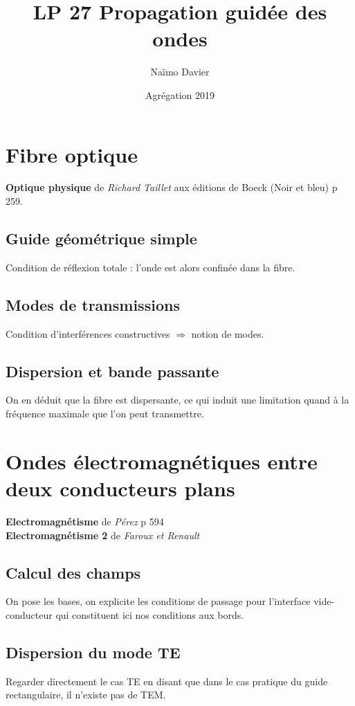\documentclass[12pt,prb,aps,epsf]{article}
\begin{document}
	
	\title{LP 27 Propagation guidée des ondes}
	\author{Naïmo Davier}
	\date{Agrégation 2019}
	\maketitle
	
	\tableofcontents
	
	\pagebreak
	
	
\section{Fibre optique}
\textbf{Optique physique} de \textit{Richard Taillet} aux éditions de Boeck (Noir et bleu) p 259.

\subsection{Guide géométrique simple}
Condition de réflexion totale : l'onde est alors confinée dans la fibre.

\subsection{Modes de transmissions}
Condition d'interférences constructives $\Longrightarrow$ notion de modes.

\subsection{Dispersion et bande passante}
On en déduit que la fibre est dispersante, ce qui induit une limitation quand à la fréquence maximale que l'on peut transmettre.


\section{Ondes électromagnétiques entre deux conducteurs plans}
\textbf{Electromagnétisme} de \textit{Pérez} p 594\\
\textbf{Electromagnétisme 2} de \textit{Faroux et Renault} 

\subsection{Calcul des champs}
On pose les bases, on explicite les conditions de passage pour l'interface vide-conducteur qui constituent ici nos conditions aux bords.

\subsection{Dispersion du mode TE}
Regarder directement le cas TE en disant que dans le cas pratique du guide rectangulaire, il n'existe pas de TEM.\\
\end{document}
